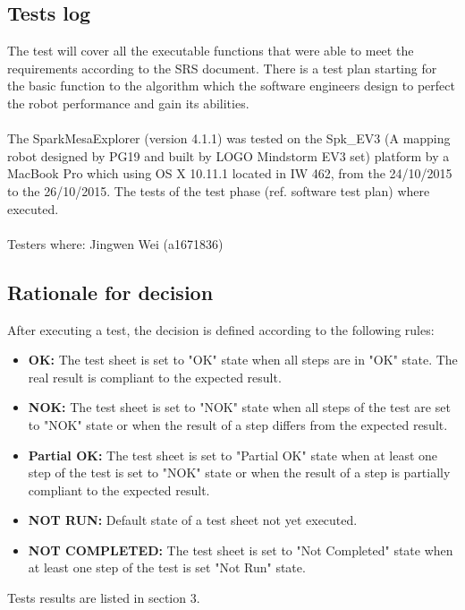 \documentclass[11pt, a4paper]{article}
\begin{document}
\subsection{Tests log}
The test will cover all the executable functions that were able to meet the requirements according to the SRS document. There is a test plan starting for the basic function to the algorithm which the software engineers design to perfect the robot performance and gain its abilities. \\
\\
The SparkMesaExplorer (version 4.1.1) was tested on the Spk\_EV3 (A mapping robot designed by PG19 and built by LOGO Mindstorm EV3 set) platform by a MacBook Pro which using OS X 10.11.1 located in IW 462, from the 24/10/2015 to the 26/10/2015. The tests of the test phase (ref. software test plan) where executed.\\
\\
Testers where: Jingwen Wei (a1671836)

\subsection{Rationale for decision}
After executing a test, the decision is defined according to the following rules: \\

\begin{itemize}
\item {\bfseries OK:} The test sheet is set to "OK" state when all steps are in "OK" state. The real result is compliant to the expected result.\\
\item {\bfseries NOK:} The test sheet is set to "NOK" state when all steps of the test are set to "NOK" state or when the result of a step differs from the expected result.\\
\item {\bfseries Partial OK:} The test sheet is set to "Partial OK" state when at least one step of the test is set to "NOK" state or when the result of a step is partially compliant to the expected result. \\
\item {\bfseries NOT RUN:} Default state of a test sheet not yet executed.\\
\item {\bfseries NOT COMPLETED:} The test sheet is set to "Not Completed" state when at least one step of the test is set "Not Run" state.\\
\end{itemize}
Tests results are listed in section 3.
\end{document}
